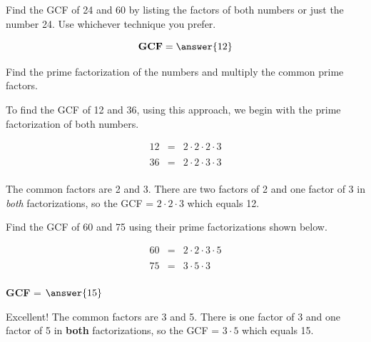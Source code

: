 \documentclass{ximera}[font=12pt]  %
\begin{document}
\begin{problem}
Find the GCF of 24 and 60 by listing the factors of both numbers or just the number 24.  Use whichever technique you prefer.

\[ \textbf{GCF} = \answer{12} \]

\end{problem}


\begin{procedure}
    
    Find the prime factorization of the numbers and multiply the common prime factors.  
    
\end{procedure}

\begin{example}

 To find the GCF of 12 and 36, using this approach, we begin with the prime factorization of both numbers.

\begin{eqnarray*}
12 &=& 2 \cdot 2 \cdot 2 \cdot 3 \\
   & & \\
36 &=& 2 \cdot 2 \cdot 3 \cdot 3 \\
\end{eqnarray*}

The common factors are 2 and 3.  There are two factors of 2 and one factor of 3 in \textit{both} factorizations, 
so the GCF = $2 \cdot 2 \cdot 3$ which equals 12.
\end{example}

\begin{problem}
Find the GCF of 60 and 75 using their prime factorizations shown below.

\begin{eqnarray*}
60 &=& 2 \cdot 2 \cdot 3 \cdot 5 \\
   & & \\
75 &=& 3 \cdot 5 \cdot 3 \\
\end{eqnarray*}

\textbf{GCF} = $\answer{15}$

\begin{feedback}
Excellent!  The common factors are 3 and 5.  There is one factor of 3 and one factor of 5 in \textbf{both} factorizations, so the GCF = $3 \cdot 5$ which equals 15.
\end{feedback}

\end{problem}
\end{document}

